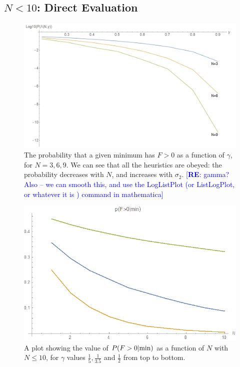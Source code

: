 \documentclass[12pt]{article}
\newcommand{\re}[1]{\textcolor{blue}{[{\bf RE}: #1]}}
\begin{document}
\subsection{$N < 10$: Direct Evaluation  }

\begin{figure}
  \centering
  \includegraphics[width=\linewidth]{N369.png}
  \caption{The probability that a given minimum has $F > 0$ as a function of $\gamma$, for $N=3, 6, 9$. We can see that all the heuristics are obeyed: the probability decreases with $N$, and increases with $\sigma_2$. \re{gamma?  Also -- we can smooth this, and use the LogListPlot (or ListLogPlot, or whatever it is ) command in mathematica}}
  \label{N6}
\end{figure}

\begin{figure}
  \centering
    \includegraphics[width=\linewidth]{PVaryingWithN.png}
  \caption{A plot showing the value of $P(F>0|{\rm min})$ as a function of $N$ with $N\le10$, for $\gamma$ values $\frac{1}{5}, \frac{1}{3.5}$ and $\frac{1}{2}$ from top to bottom.}
  \label{gamma}
\end{figure}
\end{document}
